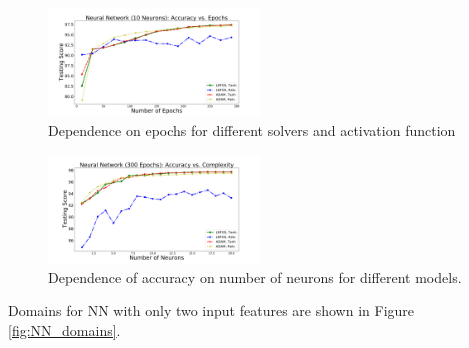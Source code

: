 \begin{figure}[h]
\hspace*{-0.5cm}
\includegraphics[width=0.5\textwidth]{plots/nn_epochs.pdf}
\caption{
Dependence on epochs for different solvers and activation function
}
\label{fig:NN_epochs}
\end{figure}



\begin{figure}[h]
\hspace*{-0.5cm}
\includegraphics[width=0.5\textwidth]{plots/nn_neurons_300epochs.pdf}
\caption{Dependence of accuracy on number of neurons for different models.}
\label{fig:NN_neurons}
\end{figure}

Domains for NN with only two input features are shown in Figure \ref{fig:NN_domains}.



